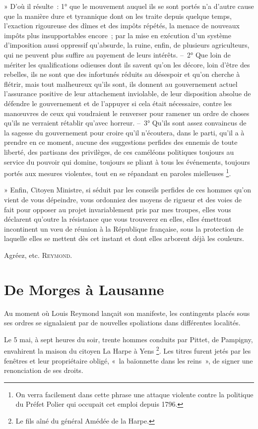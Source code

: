 \documentclass[french,twoside]{book} %
\newenvironment{quoteblock}%
  {\begin{quoting}}
  {\end{quoting}}
\newenvironment{quotebar}{%
    \def\FrameCommand{{\color{rubric!10!}\vrule width 0.5em} \hspace{0.9em}}%
    \def\OuterFrameSep{\itemsep} %
    \MakeFramed {\advance\hsize-\width \FrameRestore}
  }%
  {%
    \endMakeFramed
  }
\renewenvironment{quoteblock}%
  {%
    \savenotes
    \setstretch{0.9}
    \normalfont
    \begin{quotebar}
  }
  {%
    \end{quotebar}
    \spewnotes
  }
\begin{document}
\begin{quoteblock}
 » D’où il résulte : 1° que le mouvement auquel ils se sont portés n’a d’autre cause que la manière dure et tyrannique dont on les traite depuis quelque temps, l’exaction rigoureuse des dîmes et des impôts répétés, la menace de nouveaux impôts plus insupportables encore ; par la mise en exécution d’un système d’imposition aussi oppressif qu’absurde, la ruine, enfin, de plusieurs agriculteurs, qui ne peuvent plus suffire au payement de leurs intérêts. – 2° Que loin de mériter les qualifications odieuses dont ils savent qu’on les décore, loin d’être des rebelles, ils ne sont que des infortunés réduits au désespoir et qu’on cherche à flétrir, mais tout malheureux qu’ils sont, ils donnent au gouvernement actuel l’assurance positive de leur attachement inviolable, de leur disposition absolue de défendre le gouvernement et de l’appuyer si cela était nécessaire, contre les manœuvres de ceux qui voudraient le renverser pour ramener un ordre de choses qu’ils ne verraient rétablir qu’avec horreur. – 3° Qu’ils sont assez convaincus de la sagesse du gouvernement pour croire qu’il n’écoutera, dans le parti, qu’il a à prendre en ce moment, aucune des suggestions perfides des ennemis de toute liberté, des partisans des privilèges, de ces caméléons politiques toujours au service du pouvoir qui domine, toujours se pliant à tous les événements, toujours portés aux mesures violentes, tout en se répandant en paroles mielleuses \footnote{On verra facilement dans cette phrase une attaque violente contre la politique du Préfet Polier qui occupait cet emploi depuis 1796.}.\par
 » Enfin, Citoyen Ministre, si séduit par les conseils perfides de ces hommes qu’on vient de vous dépeindre, vous ordonniez des moyens de rigueur et des voies de fait pour opposer au projet invariablement pris par mes troupes, elles vous déclarent qu’outre la résistance que vous trouverez en elles, elles émettront incontinent un vœu de réunion à la République française, sous la protection de laquelle elles se mettent dès cet instant et dont elles arborent déjà les couleurs.\par
 Agréez, etc. {\scshape Reymond.}
 \end{quoteblock}

\section[De Morges à Lausanne]{De Morges à Lausanne}
\noindent Au moment où Louis Reymond lançait son manifeste, les contingents placés sous ses ordres se signalaient par de nouvelles spoliations dans différentes localités.\par
Le 5 mai, à sept heures du soir, trente hommes conduits par Pittet, de Pampigny, envahirent la maison du citoyen La Harpe à Yens \footnote{Le fils aîné du général Amédée de la Harpe.}. Les titres furent jetés par les fenêtres et leur propriétaire obligé, « la baïonnette dans les reins », de signer une renonciation de ses droits.\par
\end{document}
